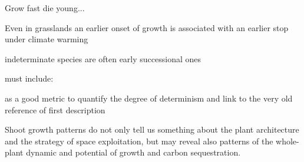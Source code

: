 \documentclass{article}
\begin{document}
 Grow fast die young...
 
 Even in grasslands an earlier onset of growth is associated with an earlier stop under climate warming \cite{mohlGrowthAlpineGrassland2022a}
	
indeterminate species are often early successional ones \citep{marksRelationExtensionGrowth1975, boojhGrowthStrategyTrees1982}

	
	must include: 
	
	\cite{iwasaOptimalGrowthSchedule1989}
	
	\cite{damascosBudCompositionBranching2005} as a good metric to quantify the degree of determinism and link to the very old reference of first description \cite{mooreStudyWinterBuds1909}
	
	\cite{guedonRelativeExtentsPreformation2006}
	
	
	Shoot growth patterns do not only tell us something about the plant architecture and the strategy of space exploitation, but may reveal also patterns of the whole-plant dynamic and potential of growth and carbon sequestration.
	\newpage
	
	
	
	
	
	
\end{document}
